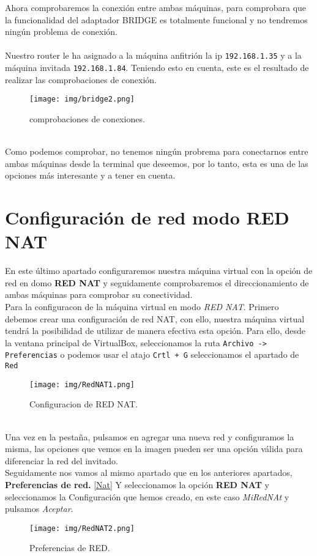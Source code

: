 \documentclass[12pt]{article}
\begin{document}
      \newpage

      Ahora comprobaremos la conexión entre ambas máquinas, para comprobara que la funcionalidad del adaptador BRIDGE es totalmente funcional 
      y no tendremos ningún problema de conexión.
      \\\\
      Nuestro router le ha asignado a la máquina anfitrión la ip \texttt{192.168.1.35} y a la máquina invitada \texttt{192.168.1.84}. Teniendo 
      esto en cuenta, este es el resultado de realizar las comprobaciones de conexión.
      \begin{figure}[h]
        \centering
        \texttt{[image: img/bridge2.png]}
        \caption{comprobaciones de conexiones.}
        \label{Bridge2}
      \end{figure}
      \\
      Como podemos comprobar, no tenemos ningún probrema para conectarnos entre ambas máquinas desde la terminal que deseemos, por lo tanto, esta 
      es una de las opciones más interesante y a tener en cuenta.

      \newpage

    \section{Configuración de red modo RED NAT}
      En este último apartado configuraremos nuestra máquina virtual con la opción de red en domo \textbf{RED NAT} y seguidamente comprobaremos el 
      direccionamiento de ambas máquinas para comprobar su conectividad.
      \\
      Para la configuracon de la máquina virtual en modo \textit{RED NAT}. Primero debemos crear una configuración de red NAT, con ello, nuestra 
      máquina virtual tendrá la posibilidad de utilizar de manera efectiva esta opción. Para ello, desde la ventana principal de VirtualBox, seleccionamos 
      la ruta \texttt{Archivo -> Preferencias} o podemos usar el atajo \texttt{Crtl + G} seleccionamos el apartado de \texttt{Red} 
      \begin{figure}[h]
        \centering
        \texttt{[image: img/RedNAT1.png]}
        \caption{Configuracion de RED NAT.}
        \label{RedNAT1}
      \end{figure}
      \\
      Una vez en la pestaña, pulsamos en agregar una nueva red y configuramos la misma, las opciones que vemos en la imagen pueden ser una opción válida para 
      diferenciar la red del invitado.
      \\
      Seguidamente nos vamos al mismo apartado que en los anteriores apartados, \textbf{Preferencias de red.} \ref{Nat} Y seleccionamos la opción \textbf{RED NAT} 
      y seleccionamos la Configuración que hemos creado, en este caso \textit{MiRedNAt} y pulsamos \textit{Aceptar}.
      \begin{figure}[h]
        \centering
        \texttt{[image: img/RedNAT2.png]}
        \caption{Preferencias de RED.}
        \label{RedNAT2}
      \end{figure}
\end{document}
